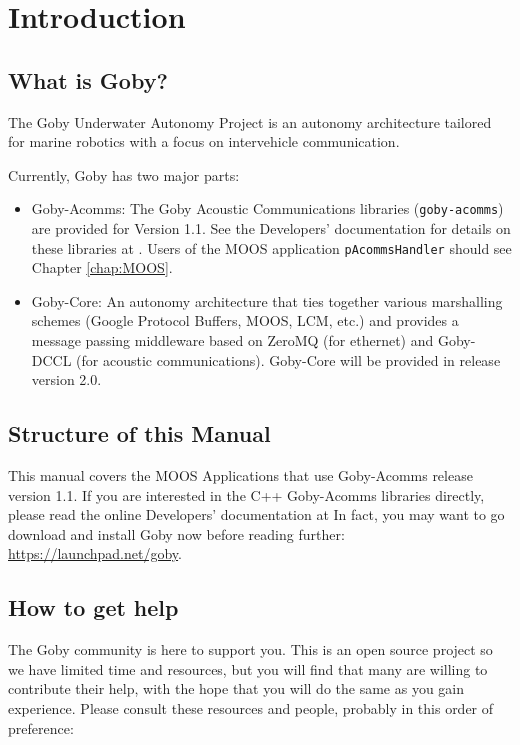 \chapter{Introduction}

\section{What is Goby?}

The Goby Underwater Autonomy Project is an \gls{autonomy architecture} tailored for marine robotics with a focus on intervehicle communication.

Currently, Goby has two major parts:

\begin{itemize}
\item Goby-Acomms: The Goby Acoustic Communications libraries (\verb|goby-acomms|) are provided for Version 1.1. See the Developers' documentation for details on these libraries at \cite{goby-doc}. Users of the MOOS application \verb|pAcommsHandler| should see Chapter \ref{chap:MOOS}.
\item Goby-Core: An \gls{autonomy architecture} that ties together various marshalling schemes (Google Protocol Buffers, MOOS, LCM, etc.) and provides a message passing middleware based on ZeroMQ (for ethernet) and Goby-DCCL (for acoustic communications). Goby-Core will be provided in release version 2.0.
\end{itemize}

\section{Structure of this Manual}
This manual covers the MOOS Applications that use Goby-Acomms release version 1.1. If you are interested in the C++ Goby-Acomms libraries directly, please read the online Developers' documentation at \cite{goby-doc} In fact, you may want to go download and install Goby now before reading further: \url{https://launchpad.net/goby}.

\section{How to get help}
The Goby community is here to support you. This is an open source project so we have limited time and resources, but you will find that many are willing to contribute their help, with the hope that you will do the same as you gain experience. Please consult these resources and people, probably in this order of preference:

